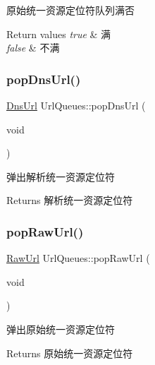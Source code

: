 原始统一资源定位符队列满否 


\begin{DoxyRetVals}{Return values}
{\em true} & 满 \\
\hline
{\em false} & 不满 \\
\hline
\end{DoxyRetVals}
\mbox{\label{class_url_queues_ae42bc6d47ae51b0c02a0360f05bf0770}} 
\subsubsection{\texorpdfstring{pop\+Dns\+Url()}{popDnsUrl()}}
{\footnotesize\ttfamily \hyperlink{class_dns_url}{Dns\+Url} Url\+Queues\+::pop\+Dns\+Url (\begin{DoxyParamCaption}\item[{void}]{ }\end{DoxyParamCaption})}



弹出解析统一资源定位符 

\begin{DoxyReturn}{Returns}
解析统一资源定位符 
\end{DoxyReturn}
\mbox{\label{class_url_queues_a8ceb4d6d67ce3b4afc7f0325ec254140}} 
\subsubsection{\texorpdfstring{pop\+Raw\+Url()}{popRawUrl()}}
{\footnotesize\ttfamily \hyperlink{class_raw_url}{Raw\+Url} Url\+Queues\+::pop\+Raw\+Url (\begin{DoxyParamCaption}\item[{void}]{ }\end{DoxyParamCaption})}



弹出原始统一资源定位符 

\begin{DoxyReturn}{Returns}
原始统一资源定位符 
\end{DoxyReturn}
\mbox{\label{class_url_queues_a4c7902b3c7ddd5c9758dbd0e5085ad18}} 
